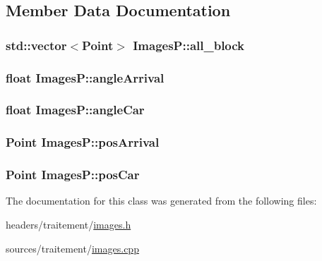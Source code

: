 \subsection{Member Data Documentation}
\hypertarget{class_images_p_ab9e279526694a7ce421cfa11b9309ed1}{
\subsubsection[{all\-\_\-block}]{\setlength{\rightskip}{0pt plus 5cm}std\-::vector$<$Point$>$ Images\-P\-::all\-\_\-block}}\label{class_images_p_ab9e279526694a7ce421cfa11b9309ed1}
\hypertarget{class_images_p_a408c61aeceb9175481adb2daca707a48}{
\subsubsection[{angle\-Arrival}]{\setlength{\rightskip}{0pt plus 5cm}float Images\-P\-::angle\-Arrival}}\label{class_images_p_a408c61aeceb9175481adb2daca707a48}
\hypertarget{class_images_p_a39c69bdd9469b4b8a2c9666e27afa7b0}{
\subsubsection[{angle\-Car}]{\setlength{\rightskip}{0pt plus 5cm}float Images\-P\-::angle\-Car}}\label{class_images_p_a39c69bdd9469b4b8a2c9666e27afa7b0}
\hypertarget{class_images_p_a621b649c63d3967849103c03082af64c}{
\subsubsection[{pos\-Arrival}]{\setlength{\rightskip}{0pt plus 5cm}Point Images\-P\-::pos\-Arrival}}\label{class_images_p_a621b649c63d3967849103c03082af64c}
\hypertarget{class_images_p_a79d1d01bae703caeee1033425e4f8f18}{
\subsubsection[{pos\-Car}]{\setlength{\rightskip}{0pt plus 5cm}Point Images\-P\-::pos\-Car}}\label{class_images_p_a79d1d01bae703caeee1033425e4f8f18}


The documentation for this class was generated from the following files\-:\begin{DoxyCompactItemize}
\item 
headers/traitement/\hyperlink{images_8h}{images.\-h}\item 
sources/traitement/\hyperlink{images_8cpp}{images.\-cpp}\end{DoxyCompactItemize}
